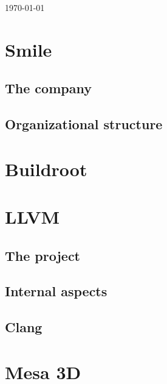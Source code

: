 \documentclass[12pt,a4paper,oneside]{article}
\begin{document}
\begin{titlepage}
	\vfill\vfill\vfill %

	{\large\today} %

	\vfill %

\end{titlepage}

\begin{abstract}

\end{abstract}
\newpage

\tableofcontents
\newpage

\section{Smile}

\subsection{The company}
\subsection{Organizational structure}

\section{Buildroot}

\section{LLVM}
\subsection{The project}
\subsection{Internal aspects}
\subsection{Clang}

\section{Mesa 3D}
\end{document}
